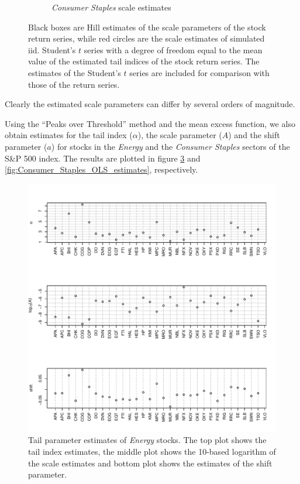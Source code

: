 \documentclass{article}
\begin{document}
\begin{figure}[htb!]
\begin{subfigure}{0.45\textwidth}
    \caption{{\it Consumer Staples} scale estimates}    
    \label{fig:Consumer_Staples_Hill_Scales}
  \end{subfigure}
  \caption{Black boxes are Hill estimates of the scale parameters of
    the stock return series, while red circles are the scale estimates
    of simulated iid. Student's $t$ series with a degree of freedom
    equal to the mean value of the estimated tail indices of the stock
    return series. The estimates of the Student's $t$ series are
    included for comparison with those of the return series.}
\end{figure}
Clearly the estimated scale parameters can differ by several orders of
magnitude. 

Using the ``Peaks over Threshold'' method and the mean excess
function, we also obtain estimates for the tail index ($\alpha$), the
scale parameter ($A$) and the shift parameter ($a$) for stocks in the
{\it Energy} and the {\it Consumer Staples} sectors of the S\&P 500
index. The results are plotted in figure
\ref{fig:Energy_OLS_estimates} and
\ref{fig:Consumer_Staples_OLS_estimates},
respectively.
\begin{figure}[htb!]
  \includegraphics[width=\textwidth]{Energy_OLS_estimates.pdf}
  \caption{Tail parameter estimates of {\it Energy} stocks. The top
    plot shows the tail index estimates, the middle plot shows the
    10-based logarithm of the scale estimates and bottom plot shows
    the estimates of the shift parameter.
  }
  \label{fig:Energy_OLS_estimates}
\end{figure}
\end{document}
